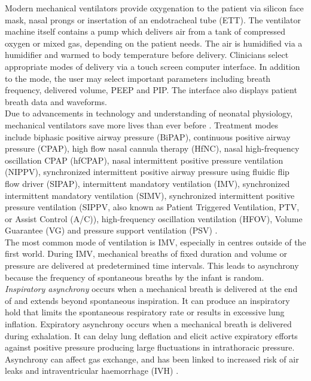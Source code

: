 \documentclass[12pt, openany, oneside]{book}
\begin{document}
Modern mechanical ventilators provide oxygenation to the patient via silicon face mask, nasal prongs or insertation of an endotracheal tube (ETT). The ventilator machine itself contains a pump which delivers air from a tank of compressed oxygen or mixed gas, depending on the patient needs. The air is humidified via a humidifier and warmed to body temperature before delivery. Clinicians select appropriate modes of delivery via a touch screen computer interface. In addition to the mode, the user may select important parameters including breath frequency, delivered volume, PEEP and PIP. The interface also displays patient breath data and waveforms.\\

Due to advancements in technology and understanding of neonatal physiology, mechanical ventilators save more lives than ever before \cite{gregory1971}.  Treatment modes include biphasic positive airway pressure (BiPAP), continuous positive airway pressure (CPAP), high flow nasal cannula therapy (HfNC), nasal high-frequency oscillation CPAP (hfCPAP), nasal intermittent positive pressure ventilation (NIPPV), synchronized intermittent positive airway pressure using fluidic flip flow driver (SIPAP),  intermittent mandatory ventilation (IMV), synchronized intermittent mandatory ventilation (SIMV), synchronized intermittent positive pressure ventilation (SIPPV, also known as Patient Triggered Ventilation, PTV, or Assist Control (A/C)), high-frequency oscillation ventilation (HFOV), Volume Guarantee (VG) and pressure support ventilation (PSV) \cite{muzza}. \\

The most common mode of ventilation is IMV, especially in centres outside of the first world. During IMV, mechanical breaths of fixed duration and volume or pressure are delivered at predetermined time intervals. This leads to asynchrony because the frequency of spontaneous breaths by the infant is random. \textit{Inspiratory asynchrony} occurs when a mechanical breath is delivered at the end of and extends beyond spontaneous inspiration. It can produce an inspiratory hold that limits the spontaneous respiratory rate or results in excessive lung inflation. Expiratory asynchrony occurs when a mechanical breath is delivered during exhalation. It can delay lung deflation and elicit active expiratory efforts against positive pressure producing large fluctuations in intrathoracic pressure. Asynchrony can affect gas exchange, and has been linked to increased risk of air leaks and intraventricular haemorrhage (IVH) \cite{evidence}. \\
\end{document}
